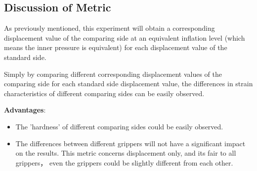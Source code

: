 \documentclass[conference]{IEEEtran}
\begin{document}
\subsection{Discussion of Metric}

As previously mentioned, this experiment will obtain a corresponding displacement value of the comparing side at an equivalent inflation level (which means the inner pressure is equivalent) for each displacement value of the standard side.

 Simply by comparing different corresponding displacement values of the comparing side for each standard side displacement value, the differences in strain characteristics of different comparing sides can be easily observed.

 \textbf{Advantages}:
 \begin{itemize}
     \item The 'hardness' of different comparing sides could be easily observed.
     \item The differences between different grippers will not have a significant impact on the results. This metric concerns displacement only, and its fair to all grippers， even the grippers could be slightly different from each other.
 \end{itemize}
 
\end{document}
